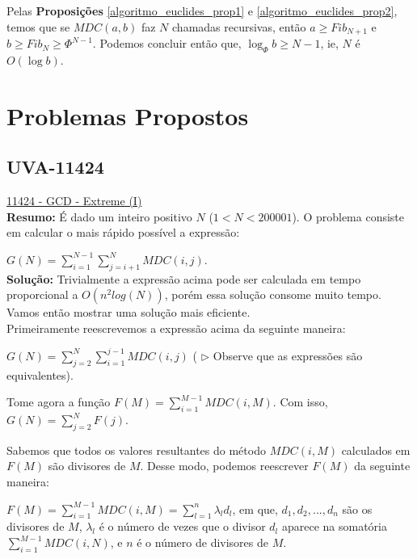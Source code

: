 Pelas \textbf{Proposições} \autoref{algoritmo_euclides_prop1} e \autoref{algoritmo_euclides_prop2}, temos que se $MDC(a,b)$ faz $N$
chamadas recursivas, então $a \geq Fib_{N+1}$ e $b \geq Fib_N \geq \Phi^{N-1}$. 
Podemos concluir então que, $\log_\Phi b \geq N-1$, ie, $N$ é $O(\log b)$. 




\section{Problemas Propostos}


\subsection{UVA-11424}
\href{https://uva.onlinejudge.org/index.php?option=onlinejudge&page=show_problem&problem=2419}{11424 - GCD - Extreme (I)} \\

\textbf{Resumo:}
É dado um inteiro positivo $N$ ($1 < N < 200001$). O problema consiste em calcular o mais rápido possível a expressão:

$G(N) = \sum_{i=1}^{N-1}\sum_{j=i+1}^{N}MDC(i,j)$.
\\

\textbf{Solução:}
Trivialmente a expressão acima pode ser calculada em tempo proporcional a $O(n^2log(N))$, porém essa solução consome muito tempo. 
Vamos então mostrar uma solução mais eficiente.
\\

Primeiramente reescrevemos a expressão acima da seguinte maneira:

$G(N) = \sum_{j=2}^N\sum_{i=1}^{j-1}MDC(i,j)$ ( $\rhd$ Observe que as expressões são equivalentes).

Tome agora a função $F(M) = \sum_{i=1}^{M-1}MDC(i, M)$. Com isso, $G(N) = \sum_{j=2}^NF(j)$.

Sabemos que todos os valores resultantes do método $MDC(i,M)$ calculados em $F(M)$ são divisores de $M$. Desse modo, podemos reescrever $F(M)$ da seguinte maneira:

$F(M) = \sum_{i=1}^{M-1}MDC(i, M) = \sum_{l=1}^{n}\lambda_l d_l$, em que, $d_1, d_2,..., d_n$ são os divisores de $M$, $\lambda_l$ é o número de vezes que o divisor $d_l$ aparece na somatória $\sum_{i=1}^{M-1}MDC(i,N)$, e $n$ é o número de divisores de $M$.
\\

